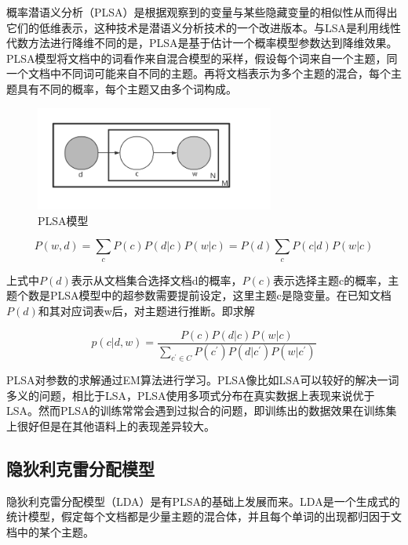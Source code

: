 \documentclass[winfonts,master,oneside,nobackinfo]{njuthesis}
\begin{document}
概率潜语义分析（PLSA）是根据观察到的变量与某些隐藏变量的相似性从而得出它们的低维表示，这种技术是潜语义分析技术的一个改进版本。与LSA是利用线性代数方法进行降维不同的是，PLSA是基于估计一个概率模型参数达到降维效果。PLSA模型将文档中的词看作来自混合模型的采样，假设每个词来自一个主题，同一个文档中不同词可能来自不同的主题。再将文档表示为多个主题的混合，每个主题具有不同的概率，每个主题又由多个词构成。

\begin{figure}[h]
\centering
\begin{minipage}[t]{1\textwidth}
\centering
\includegraphics[width=0.7\textwidth]{./figure/PLSA.jpg}
\caption{PLSA模型}
\label{lab:1}
\end{minipage}
\end{figure}
$$P ( w , d ) = \sum _ { c } P ( c ) P ( d | c ) P ( w | c ) = P ( d ) \sum _ { c } P ( c | d ) P ( w | c )$$

上式中$P ( d )$表示从文档集合选择文档d的概率，$P ( c )$表示选择主题c的概率，主题个数是PLSA模型中的超参数需要提前设定，这里主题c是隐变量。在已知文档$P ( d )$和其对应词表w后，对主题进行推断。即求解

$$p ( c | d , w ) = \frac { P ( c ) P ( d | c ) P ( w | c ) } { \sum _ { c ^ { \prime } \in C } P \left( c ^ { \prime } \right) P ( d | c ^ { \prime } ) P ( w | c ^ { \prime } ) }$$

PLSA对参数的求解通过EM算法进行学习。PLSA像比如LSA可以较好的解决一词多义的问题，相比于LSA，PLSA使用多项式分布在真实数据上表现来说优于LSA。然而PLSA的训练常常会遇到过拟合的问题，即训练出的数据效果在训练集上很好但是在其他语料上的表现差异较大。

\subsection{隐狄利克雷分配模型}

隐狄利克雷分配模型（LDA）是有PLSA的基础上发展而来。LDA是一个生成式的统计模型，假定每个文档都是少量主题的混合体，并且每个单词的出现都归因于文档中的某个主题。
\end{document}
